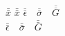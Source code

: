 \documentclass{amsart}
\theoremstyle{remark}
\newcommand*{\rttensor}[1]{\overline{\overline{#1}}}
\newcommand*{\rttensortwo}[1]{\bar{\bar{#1}}}
\begin{document}
\(\bar{\bar{x}}\)
$\bar\bar{x}$
\noindent
$\rttensor{\epsilon} \quad \rttensor{\sigma} \quad \rttensor{G}$\\[1em]
$\rttensortwo{\epsilon} \quad \rttensortwo{\sigma} \quad \rttensortwo{G}$
\end{document}
